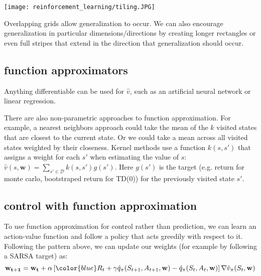 \begin{center}\texttt{[image: reinforcement\_learning/tiling.JPG]}\end{center}

Overlapping grids allow generalization to occur. We can also encourage generalization in particular dimensions/directions by creating longer rectangles or even full stripes that extend in the direction that generalization should occur.

\subsection{function approximators}
Anything differentiable can be used for $\hat{v}$, such as an artificial neural network or linear regression.

There are also non-parametric approaches to function approximation. For example, a nearest neighbors approach could take the mean of the $k$ visited states that are closest to the current state. Or we could take a mean across all visited states weighted by their closeness. Kernel methods use a function $k(s,s')$ that assigns a weight for each $s'$ when estimating the value of $s$: $\hat{v}(s,\mathbf{w}) = \sum_{s' \in \mathcal{D}} k(s,s') g(s')$. Here $g(s')$ is the target (e.g. return for monte carlo, bootstraped return for TD(0)) for the previously visited state $s'$.

\subsection{control with function approximation}
To use function approximation for control rather than prediction, we can learn an action-value function and follow a policy that acts greedily with respect to it. Following the pattern above, we can update our weights (for example by following a SARSA target) as:
$$
\mathbf{w_{t+1}} = \mathbf{w_{t}} + \alpha \left[{\color{blue}R_t + \gamma \hat{q}_\pi(S_{t+1}, A_{t+1}, \mathbf{w})} - \hat{q}_\pi(S_t, A_t, \mathbf{w})\right] \nabla \hat{v}_\pi(S_{t}, \mathbf{w})
$$
